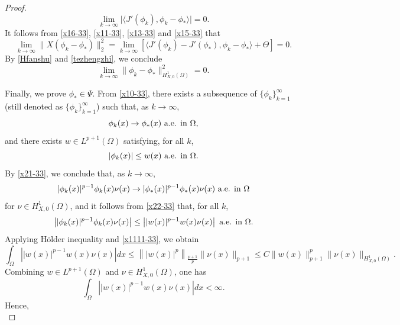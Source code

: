 \documentclass[10pt,a4paper]{amsart}
\begin{document}
\begin{proof}
\begin{equation}
\lim_{k\rightarrow\infty}\big|\langle J'(\phi_k),\phi_k-\phi_*\rangle\big|=0.
\end{equation}
It follows from \eqref{x16-33}, \eqref{x11-33}, \eqref{x13-33} and \eqref{x15-33} that
\begin{equation*}
\lim_{k\rightarrow\infty}\|X(\phi_k-\phi_*)\|_2^2=\lim_{k\rightarrow\infty}\left[\langle J'(\phi_k)-J'(\phi_*),\phi_k-\phi_*\rangle+\Theta\right]=0.
\end{equation*}
By \eqref{Hfanshu} and \eqref{tezhengzhi}, we conclude
\begin{equation*}
\lim_{k\rightarrow\infty}\|\phi_k-\phi_*\|_{H_{X,0}^1(\Omega)}^2=0.
\end{equation*}

Finally, we prove $\phi_*\in \Psi$. From \eqref{x10-33}, there exists a subsequence of $\{\phi_k\}_{k=1}^\infty$ (still denoted as $\{\phi_k\}_{k=1}^\infty$) such that, as $k\rightarrow\infty$,
\begin{equation}\label{x21-33}
\phi_k(x)\rightarrow \phi_*(x) \hbox{ a.e. in } \Omega,
\end{equation}
and there exists $w\in L^{p+1}(\Omega)$ satisfying, for all $k$,
\begin{equation}\label{x22-33}
|\phi_k(x)|\leq w(x) \hbox{ a.e. in } \Omega.
\end{equation}
By \eqref{x21-33}, we conclude that, as $k\rightarrow\infty$,
\begin{equation}\label{x24-33}
|\phi_k(x)|^{p-1}\phi_k(x)\nu(x)\rightarrow |\phi_*(x)|^{p-1}\phi_*(x)\nu(x) \hbox{ a.e. in } \Omega
\end{equation}
for $\nu\in H_{X,0}^1(\Omega)$, and it follows from \eqref{x22-33} that, for all $k$,
\begin{equation}\label{x25-33}
\left||\phi_k(x)|^{p-1}\phi_k(x)\nu(x)\right|\leq \left||w(x)|^{p-1}w(x)\nu(x)\right| \hbox{ a.e. in } \Omega.
\end{equation}
Applying H\"{o}lder inequality and \eqref{x1111-33}, we obtain
\begin{equation*}
\int_\Omega\left||w(x)|^{p-1}w(x)\nu(x)\right|dx\leq\left\||w(x)|^p\right\|_{\frac{p+1}{p}}\|\nu(x)\|_{p+1}\leq C\|w(x)\|_{p+1}^p\|\nu(x)\|_{H_{X,0}^1(\Omega)}.
\end{equation*}
Combining $w\in L^{p+1}(\Omega)$ and $\nu\in H_{X,0}^1(\Omega)$, one has
\begin{equation*}
\int_\Omega\left||w(x)|^{p-1}w(x)\nu(x)\right|dx<\infty.
\end{equation*}
Hence,
\begin{equation}\label{vvv}

\end{equation}
\end{proof}
\end{document}
